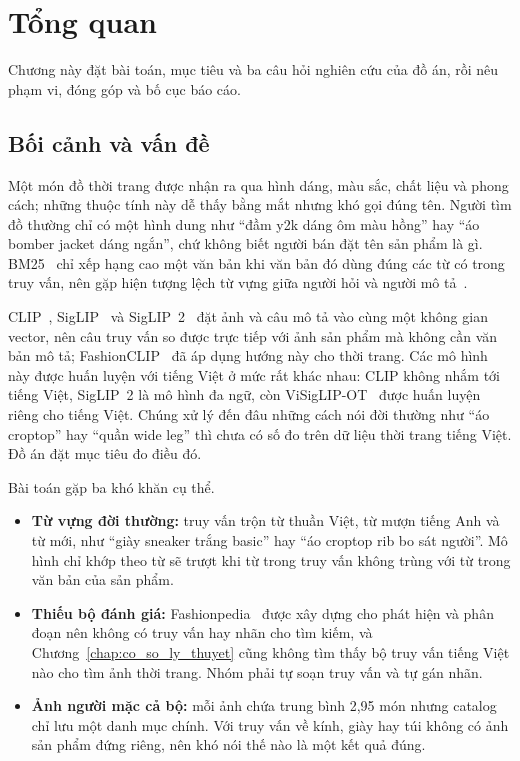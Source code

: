 \chapter{Tổng quan}
\label{chap:tong_quan}

Chương này đặt bài toán, mục tiêu và ba câu hỏi nghiên cứu của đồ án, rồi nêu phạm vi, đóng góp và bố cục báo cáo.

\section{Bối cảnh và vấn đề}
\label{sec:boi-canh}

Một món đồ thời trang được nhận ra qua hình dáng, màu sắc, chất liệu và phong cách; những thuộc tính này dễ thấy bằng mắt nhưng khó gọi đúng tên. Người tìm đồ thường chỉ có một hình dung như ``đầm y2k dáng ôm màu hồng'' hay ``áo bomber jacket dáng ngắn'', chứ không biết người bán đặt tên sản phẩm là gì. BM25~\cite{robertson2009bm25} chỉ xếp hạng cao một văn bản khi văn bản đó dùng đúng các từ có trong truy vấn, nên gặp hiện tượng lệch từ vựng giữa người hỏi và người mô tả~\cite{manning2008ir}.

CLIP~\cite{radford2021clip}, SigLIP~\cite{zhai2023siglip} và SigLIP~2~\cite{tschannen2025siglip2} đặt ảnh và câu mô tả vào cùng một không gian vector, nên câu truy vấn so được trực tiếp với ảnh sản phẩm mà không cần văn bản mô tả; FashionCLIP~\cite{chia2022fashionclip} đã áp dụng hướng này cho thời trang. Các mô hình này được huấn luyện với tiếng Việt ở mức rất khác nhau: CLIP không nhắm tới tiếng Việt, SigLIP~2 là mô hình đa ngữ, còn ViSigLIP-OT~\cite{viclipot2026} được huấn luyện riêng cho tiếng Việt. Chúng xử lý đến đâu những cách nói đời thường như ``áo croptop'' hay ``quần wide leg'' thì chưa có số đo trên dữ liệu thời trang tiếng Việt. Đồ án đặt mục tiêu đo điều đó.

Bài toán gặp ba khó khăn cụ thể.

\begin{itemize}
    \item \textbf{Từ vựng đời thường:} truy vấn trộn từ thuần Việt, từ mượn tiếng Anh và từ mới, như ``giày sneaker trắng basic'' hay ``áo croptop rib bo sát người''. Mô hình chỉ khớp theo từ sẽ trượt khi từ trong truy vấn không trùng với từ trong văn bản của sản phẩm.
    \item \textbf{Thiếu bộ đánh giá:} Fashionpedia~\cite{jia2020fashionpedia} được xây dựng cho phát hiện và phân đoạn nên không có truy vấn hay nhãn cho tìm kiếm, và Chương~\ref{chap:co_so_ly_thuyet} cũng không tìm thấy bộ truy vấn tiếng Việt nào cho tìm ảnh thời trang. Nhóm phải tự soạn truy vấn và tự gán nhãn.
    \item \textbf{Ảnh người mặc cả bộ:} mỗi ảnh chứa trung bình 2,95 món nhưng catalog chỉ lưu một danh mục chính. Với truy vấn về kính, giày hay túi không có ảnh sản phẩm đứng riêng, nên khó nói thế nào là một kết quả đúng.
\end{itemize}

